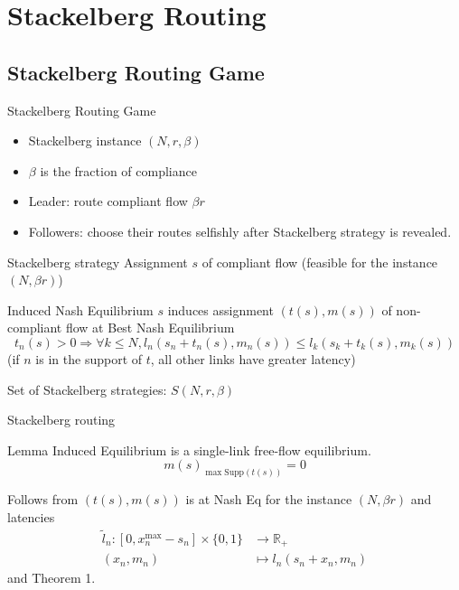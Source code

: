 \documentclass[english, smaller]{beamer}
\theoremstyle{plain}
\theoremstyle{definition}
\theoremstyle{plain}
\theoremstyle{plain}
\begin{document}
\section{Stackelberg Routing}

\subsection{Stackelberg Routing Game}
\begin{frame}{Stackelberg Routing Game}

\begin{itemize}
\item Stackelberg instance $(N, r, \beta)$
\item $\beta$ is the fraction of compliance
\item Leader: route compliant flow $\beta r$
\item Followers: choose their routes selfishly after Stackelberg strategy is revealed.
\end{itemize}


\begin{block}{Stackelberg strategy}
Assignment $s$ of compliant flow (feasible for the instance $(N,\beta r)$)
\end{block}

\begin{block}{Induced Nash Equilibrium}
$s$ induces assignment $(t(s), m(s))$ of non-compliant flow at Best Nash Equilibrium
\[
t_n(s)>0 \Rightarrow \forall k \leq N, l_n(s_n + t_n(s), m_n(s)) \leq l_k(s_k + t_k(s), m_k(s))
\]
(if $n$ is in the support of $t$, all other links have greater latency)
\end{block}

Set of Stackelberg strategies: $S(N, r, \beta)$

\end{frame}


\begin{frame}{Stackelberg routing}

\begin{block}{Lemma}
Induced Equilibrium is a single-link free-flow equilibrium.
\[
m(s)_{\max \text{Supp}(t(s))} = 0
\]
\end{block}

Follows from $(t(s), m(s))$ is at Nash Eq for the instance $(N,\beta r)$ and latencies
\begin{align*}
\tilde{l}_n: [0, x_n^{\max} - s_n]\times \{0,1\} & \rightarrow \mathbb{R}_+\\
(x_n,m_n) & \mapsto l_n(s_n+x_n,m_n)
\end{align*}
and Theorem 1.

\end{frame}
\end{document}
